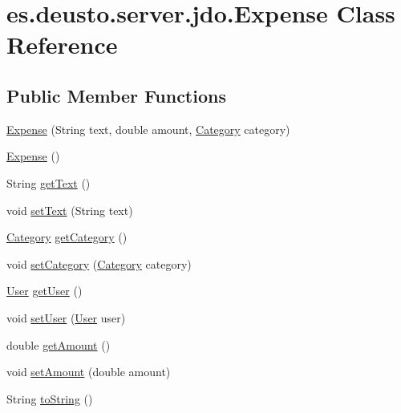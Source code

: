 \hypertarget{classes_1_1deusto_1_1server_1_1jdo_1_1_expense}{}\section{es.\+deusto.\+server.\+jdo.\+Expense Class Reference}
\label{classes_1_1deusto_1_1server_1_1jdo_1_1_expense}
\subsection*{Public Member Functions}
\begin{DoxyCompactItemize}
\item 
\hyperlink{classes_1_1deusto_1_1server_1_1jdo_1_1_expense_a80b54e33274b86a95c73577a1d02dfb1}{Expense} (String text, double amount, \hyperlink{enumes_1_1deusto_1_1server_1_1jdo_1_1_category}{Category} category)
\item 
\hyperlink{classes_1_1deusto_1_1server_1_1jdo_1_1_expense_a3e6eb52eb523e57019cc5680dd10ccb9}{Expense} ()
\item 
String \hyperlink{classes_1_1deusto_1_1server_1_1jdo_1_1_expense_a74c9c4b9dfb369bc817d6864d35efb71}{get\+Text} ()
\item 
void \hyperlink{classes_1_1deusto_1_1server_1_1jdo_1_1_expense_aff1a35b5f6a893ddfafaa2eda21534d2}{set\+Text} (String text)
\item 
\hyperlink{enumes_1_1deusto_1_1server_1_1jdo_1_1_category}{Category} \hyperlink{classes_1_1deusto_1_1server_1_1jdo_1_1_expense_a5fc577cffd2b708187c199ce2e8f0770}{get\+Category} ()
\item 
void \hyperlink{classes_1_1deusto_1_1server_1_1jdo_1_1_expense_aff380f7cb2ae1691daaef89fbd547974}{set\+Category} (\hyperlink{enumes_1_1deusto_1_1server_1_1jdo_1_1_category}{Category} category)
\item 
\hyperlink{classes_1_1deusto_1_1server_1_1jdo_1_1_user}{User} \hyperlink{classes_1_1deusto_1_1server_1_1jdo_1_1_expense_aebec4f2e492f8f188c09b7264f19dc57}{get\+User} ()
\item 
void \hyperlink{classes_1_1deusto_1_1server_1_1jdo_1_1_expense_ab15c5d072af65f8a6f09467e6567db5b}{set\+User} (\hyperlink{classes_1_1deusto_1_1server_1_1jdo_1_1_user}{User} user)
\item 
double \hyperlink{classes_1_1deusto_1_1server_1_1jdo_1_1_expense_ad877eb6362a3762e7943097000a46d9d}{get\+Amount} ()
\item 
void \hyperlink{classes_1_1deusto_1_1server_1_1jdo_1_1_expense_a69c018cdd351649ec59c18685fe7a18b}{set\+Amount} (double amount)
\item 
String \hyperlink{classes_1_1deusto_1_1server_1_1jdo_1_1_expense_a0f197f3e223803cab5fba71cc481af31}{to\+String} ()
\end{DoxyCompactItemize}


